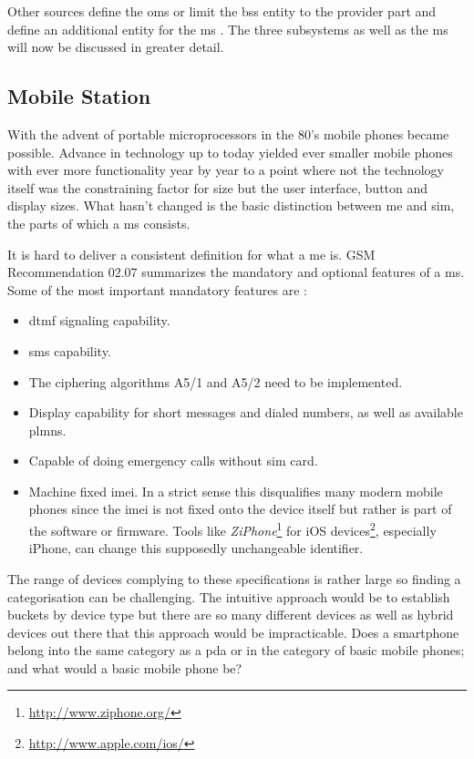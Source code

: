 Other sources define the \gls{oms} \cite{GSM2009} or limit the \gls{bss} entity to the provider part and define an additional entity for the \gls{ms} \cite{overview1994, overview1996}.
The three subsystems as well as the \gls{ms} will now be discussed in greater detail.

\subsection{Mobile Station}
\label{sec:ms}
With the advent of portable microprocessors in the 80's mobile phones became possible.
Advance in technology up to today yielded ever smaller mobile phones with ever more functionality year by year to a point where not the technology itself was the constraining factor for size but the user interface, \eg button and display sizes.
What hasn't changed is the basic distinction between \gls{me} and \gls{sim}, the parts of which a \gls{ms} consists.

It is hard to deliver a consistent definition for what a \gls{me} is.
GSM Recommendation 02.07 \cite{GSM0207} summarizes the mandatory and optional features of a \gls{ms}.
Some of the most important mandatory features are \cite{protocols1999}:
\begin{itemize}
	\item \gls{dtmf} signaling capability.
	\item \gls{sms} capability.
	\item The ciphering algorithms A5/1 and A5/2 need to be implemented.
	\item Display capability for short messages and dialed numbers, as well as available \gls{plmn}s.
	\item Capable of doing emergency calls without \gls{sim} card.
	\item Machine fixed \gls{imei}.
	In a strict sense this disqualifies many modern mobile phones since the \gls{imei} is not fixed onto the device itself but rather is part of the software or firmware.
	Tools like \emph{ZiPhone}\footnote{\url{http://www.ziphone.org/}} for iOS devices\footnote{\url{http://www.apple.com/ios/}}, especially iPhone, can change this supposedly unchangeable identifier.
\end{itemize}

The range of devices complying to these specifications is rather large so finding a categorisation can be challenging.
The intuitive approach would be to establish buckets by device type but there are so many different devices as well as hybrid devices out there that this approach would be impracticable.
Does a smartphone belong into the same category as a \gls{pda} or in the category of basic mobile phones; and what would a basic mobile phone be?

